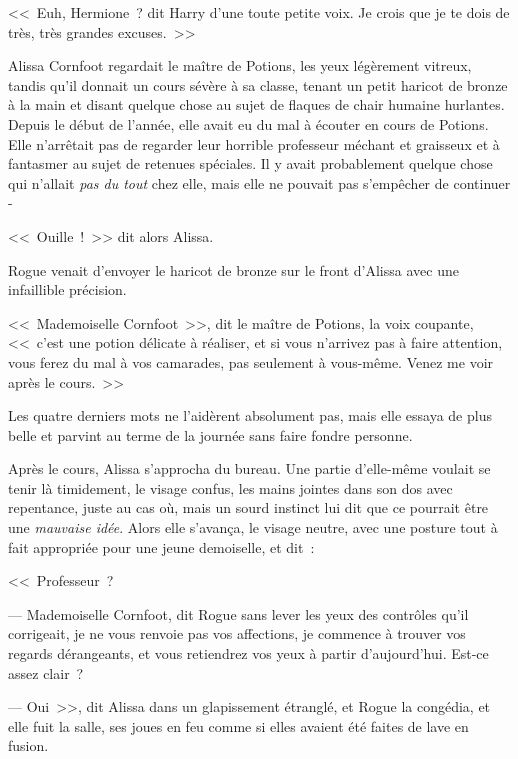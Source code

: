 
<<~Euh, Hermione~? dit Harry d'une toute petite voix. Je crois que je te dois de très, très grandes excuses.~>>


Alissa Cornfoot regardait le maître de Potions, les yeux légèrement vitreux, tandis qu'il donnait un cours sévère à sa classe, tenant un petit haricot de bronze à la main et disant quelque chose au sujet de flaques de chair humaine hurlantes. Depuis le début de l'année, elle avait eu du mal à écouter en cours de Potions. Elle n'arrêtait pas de regarder leur horrible professeur méchant et graisseux et à fantasmer au sujet de retenues spéciales. Il y avait probablement quelque chose qui n'allait \emph{pas du tout} chez elle, mais elle ne pouvait pas s'empêcher de continuer -

<<~Ouille~!~>> dit alors Alissa.

Rogue venait d'envoyer le haricot de bronze sur le front d'Alissa avec une infaillible précision.

<<~Mademoiselle Cornfoot~>>, dit le maître de Potions, la voix coupante, <<~c'est une potion délicate à réaliser, et si vous n'arrivez pas à faire attention, vous ferez du mal à vos camarades, pas seulement à vous-même. Venez me voir après le cours.~>>

Les quatre derniers mots ne l'aidèrent absolument pas, mais elle essaya de plus belle et parvint au terme de la journée sans faire fondre personne.

Après le cours, Alissa s'approcha du bureau. Une partie d'elle-même voulait se tenir là timidement, le visage confus, les mains jointes dans son dos avec repentance, juste au cas où, mais un sourd instinct lui dit que ce pourrait être une \emph{mauvaise idée}. Alors elle s'avança, le visage neutre, avec une posture tout à fait appropriée pour une jeune demoiselle, et dit~:

<<~Professeur~?

--- Mademoiselle Cornfoot, dit Rogue sans lever les yeux des contrôles qu'il corrigeait, je ne vous renvoie pas vos affections, je commence à trouver vos regards dérangeants, et vous retiendrez vos yeux à partir d'aujourd'hui. Est-ce assez clair~?

--- Oui~>>, dit Alissa dans un glapissement étranglé, et Rogue la congédia, et elle fuit la salle, ses joues en feu comme si elles avaient été faites de lave en fusion.

